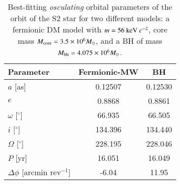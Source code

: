 \documentclass[twocolumn]{aa}
\begin{document}
\begin{table}[t]
\caption{Best-fitting \textit{osculating} orbital parameters of the orbit of the S2 star for two different models: a fermionic DM model with $m=56~{\rm keV}~c^{-2}$, core mass $M_{\rm{core}}=3.5\times 10^6 M_\odot$, and a BH of mass  $M_{\rm bh}=4.075\times 10^6 M_\odot$.}
\centering
\begin{tabular}{lcc}
\hline
Parameter & Fermionic-MW & BH \\
\hline
$a$ [as] & 0.12507 & 0.12530 \\
$e$ & 0.8868 & 0.8861 \\
$\omega$ [$^{\circ}$] & 66.935 & 66.505 \\
$i$ [$^{\circ}$] & 134.396 & 134.440 \\
$\Omega$ [$^{\circ}$] & 228.195 & 228.046 \\
$P$ [yr] & 16.051 & 16.049 \\
$\Delta \phi$ [arcmin rev$^{-1}$] & -6.04 & 11.95 \\
\hline
\end{tabular}
\label{tab:S2}
\end{table}
%
\end{document}
